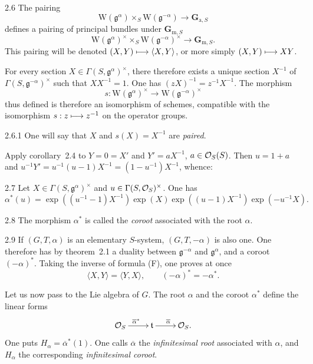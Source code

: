 \begin{corollary}{2.6}\label{XX.2.6}
The pairing
\[
\mathrm W(\mathfrak g^\alpha)\times_S\mathrm W(\mathfrak g^{-\alpha})\to\mathbf G_{\mathrm a,S}
\]
defines a pairing of principal bundles under $\mathbf G_{\mathrm m,S}$
\[
\mathrm W(\mathfrak g^\alpha)^\times\times_S\mathrm W(\mathfrak g^{-\alpha})^\times\to\mathbf G_{\mathrm m,S}.
\]
This pairing will be denoted $(X,Y)\longmapsto\langle X,Y\rangle$, or more simply $(X,Y)\longmapsto XY$.

For every section $X\in\Gamma(S,\mathfrak g^\alpha)^\times$, there therefore exists a unique section $X^{-1}$ of $\Gamma(S,\mathfrak g^{-\alpha})^\times$ such that $XX^{-1}=1$. One has $(zX)^{-1}=z^{-1}X^{-1}$. The morphism
\[
s:\mathrm W(\mathfrak g^\alpha)^\times\to\mathrm W(\mathfrak g^{-\alpha})^\times
\]
thus defined is therefore an isomorphism of schemes, compatible with the isomorphism $s:z\longmapsto z^{-1}$ on the operator groups.
\end{corollary}
\begin{definition}{2.6.1}\label{XX.2.6.1}
One will say that $X$ and $s(X)=X^{-1}$ are \emph{paired}.
\end{definition}
Apply corollary~2.4 to $Y=0=X'$ and $Y'=aX^{-1}$, $a\in\mathcal{O}_S(S)$. Then $u=1+a$ and $u^{-1}Y'=u^{-1}(u-1)X^{-1}=(1-u^{-1})X^{-1}$, whence:
\begin{corollary}{2.7}\label{XX.2.7}
Let $X\in\Gamma(S,\mathfrak g^\alpha)^\times$ and $u\in\Gamma(S,\mathcal{O}_S)^\times$. One has
\[
\alpha^*(u)=\exp((u^{-1}-1)X^{-1})\exp(X)\exp((u-1)X^{-1})\exp(-u^{-1}X).
\]
\end{corollary}
\begin{definition}{2.8}\label{XX.2.8}
The morphism $\alpha^*$ is called the \emph{coroot} associated with the root $\alpha$.
\end{definition}
\begin{remark}{2.9}\label{XX.2.9}
If $(G,T,\alpha)$ is an elementary $S$-system, $(G,T,-\alpha)$ is also one. One therefore has by theorem~2.1 a duality between $\mathfrak g^{-\alpha}$ and $\mathfrak g^\alpha$, and a coroot $(-\alpha)^*$. Taking the inverse of formula (F), one proves at once
\[
\langle X,Y\rangle=\langle Y,X\rangle,\qquad(-\alpha)^*=-\alpha^*.
\]
\end{remark}
Let us now pass to the Lie algebra of $G$. The root $\alpha$ and the coroot $\alpha^*$ define the linear forms
\[
\xymatrix{\OS\ar[r]^{\overline{\alpha}^*}&\mathfrak t\ar[r]^{\overline\alpha}&\OS.}
\]
One puts $H_\alpha=\overline\alpha^*(1)$. One calls $\overline\alpha$ the \emph{infinitesimal root} associated with $\alpha$, and $H_\alpha$ the corresponding \emph{infinitesimal coroot}.

